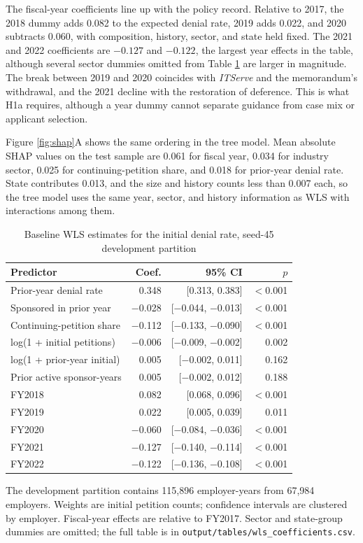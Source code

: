 \documentclass[9pt,twoside]{pnas-new}
\begin{document}
The fiscal-year coefficients line up with the policy record. Relative to 2017, the 2018 dummy adds 0.082 to the expected denial rate, 2019 adds 0.022, and 2020 subtracts 0.060, with composition, history, sector, and state held fixed. The 2021 and 2022 coefficients are $-0.127$ and $-0.122$, the largest year effects in the table, although several sector dummies omitted from Table \ref{tab:coef} are larger in magnitude. The break between 2019 and 2020 coincides with \emph{ITServe} and the memorandum's withdrawal, and the 2021 decline with the restoration of deference. This is what H1a requires, although a year dummy cannot separate guidance from case mix or applicant selection.

Figure \ref{fig:shap}A shows the same ordering in the tree model. Mean absolute SHAP values on the test sample are 0.061 for fiscal year, 0.034 for industry sector, 0.025 for continuing-petition share, and 0.018 for prior-year denial rate. State contributes 0.013, and the size and history counts less than 0.007 each, so the tree model uses the same year, sector, and history information as WLS with interactions among them.

\begin{table}[t]
\centering
\caption{Baseline WLS estimates for the initial denial rate, seed-45 development partition}
\label{tab:coef}
\begin{minipage}{0.86\linewidth}
\centering
\begin{tabular}{lrrr}
\toprule
Predictor & Coef. & 95\% CI & $p$ \\
\midrule
Prior-year denial rate & 0.348 & [0.313, 0.383] & $<$0.001 \\
Sponsored in prior year & $-$0.028 & [$-$0.044, $-$0.013] & $<$0.001 \\
Continuing-petition share & $-$0.112 & [$-$0.133, $-$0.090] & $<$0.001 \\
log(1 + initial petitions) & $-$0.006 & [$-$0.009, $-$0.002] & 0.002 \\
log(1 + prior-year initial) & 0.005 & [$-$0.002, 0.011] & 0.162 \\
Prior active sponsor-years & 0.005 & [$-$0.002, 0.012] & 0.188 \\
\addlinespace
FY2018 & 0.082 & [0.068, 0.096] & $<$0.001 \\
FY2019 & 0.022 & [0.005, 0.039] & 0.011 \\
FY2020 & $-$0.060 & [$-$0.084, $-$0.036] & $<$0.001 \\
FY2021 & $-$0.127 & [$-$0.140, $-$0.114] & $<$0.001 \\
FY2022 & $-$0.122 & [$-$0.136, $-$0.108] & $<$0.001 \\
\bottomrule
\end{tabular}
\par\smallskip
{\scriptsize The development partition contains 115,896 employer-years from 67,984 employers. Weights are initial petition counts; confidence intervals are clustered by employer. Fiscal-year effects are relative to FY2017. Sector and state-group dummies are omitted; the full table is in \texttt{output/tables/wls\_coefficients.csv}.\par}
\end{minipage}
\end{table}
\end{document}
